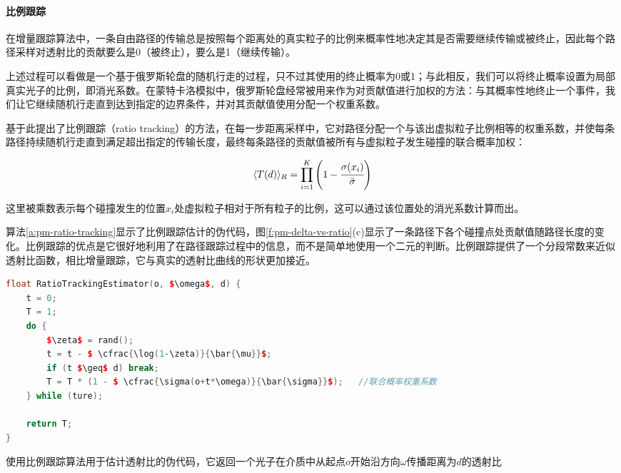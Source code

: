\paragraph{比例跟踪}
在增量跟踪算法中，一条自由路径的传输总是按照每个距离处的真实粒子的比例来概率性地决定其是否需要继续传输或被终止，因此每个路径采样对透射比的贡献要么是0（被终止），要么是1（继续传输）。

上述过程可以看做是一个基于俄罗斯轮盘的随机行走的过程，只不过其使用的终止概率为0或1；与此相反，我们可以将终止概率设置为局部真实光子的比例，即消光系数。在蒙特卡洛模拟中，俄罗斯轮盘经常被用来作为对贡献值进行加权的方法\cite{a:ComparativeanalysisofdiscreteandcontinuousabsorptionweightingestimatorsusedinMonteCarlosimulationsofradiativetransportinturbidmedia}：与其概率性地终止一个事件，我们让它继续随机行走直到达到指定的边界条件，并对其贡献值使用分配一个权重系数。

\cite{a:ResidualRatioTrackingforEstimatingAttenuationinParticipatingMedia}基于此提出了比例跟踪（ratio tracking）的方法，在每一步距离采样中，它对路径分配一个与该出虚拟粒子比例相等的权重系数，并使每条路径持续随机行走直到满足超出指定的传输长度，最终每条路径的贡献值被所有与虚拟粒子发生碰撞的联合概率加权：

\begin{equation}\label{e:pm-ratio}
	\langle T(d)\rangle_R=\prod^{K}_{i=1}\Bigg(1- \cfrac{\sigma(x_i)}{\bar{\sigma}}\Bigg)
\end{equation}

这里被乘数表示每个碰撞发生的位置$x_i$处虚拟粒子相对于所有粒子的比例，这可以通过该位置处的消光系数计算而出。

算法\ref{a:pm-ratio-tracking}显示了比例跟踪估计的伪代码，图\ref{f:pm-delta-vs-ratio}(c)显示了一条路径下各个碰撞点处贡献值随路径长度的变化。比例跟踪的优点是它很好地利用了在路径跟踪过程中的信息，而不是简单地使用一个二元的判断。比例跟踪提供了一个分段常数来近似透射比函数，相比增量跟踪，它与真实的透射比曲线的形状更加接近。

\begin{algorithm}
\begin{lstlisting}[language=C++, mathescape]
float RatioTrackingEstimator(o, $\omega$, d) {
	t = 0;
	T = 1;
	do {
		$\zeta$ = rand();
		t = t - $ \cfrac{\log(1-\zeta)}{\bar{\mu}}$;
		if (t $\geq$ d) break;
		T = T * (1 - $ \cfrac{\sigma(o+t*\omega)}{\bar{\sigma}}$);   //联合概率权重系数
	} while (ture);
	
	return T;
}
\end{lstlisting}
\caption{使用比例跟踪算法用于估计透射比的伪代码，它返回一个光子在介质中从起点$o$开始沿方向$\omega$传播距离为$d$的透射比}
\label{a:pm-ratio-tracking}
\end{algorithm}

